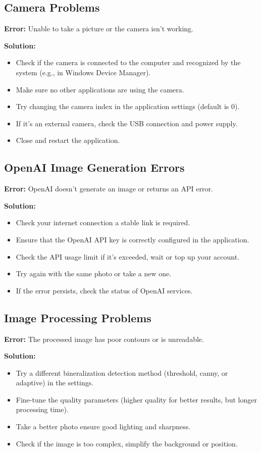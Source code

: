 \documentclass[a4paper,12pt]{article}
\begin{document}
\subsection{Camera Problems}
\textbf{Error:} Unable to take a picture or the camera isn't working.

\textbf{Solution:}
\begin{itemize}
\item Check if the camera is connected to the computer and recognized by the system (e.g., in Windows Device Manager).
\item Make sure no other applications are using the camera.
\item Try changing the camera index in the application settings (default is 0).
\item If it's an external camera, check the USB connection and power supply.
\item Close and restart the application.
\end{itemize}

\subsection{OpenAI Image Generation Errors}
\textbf{Error:} OpenAI doesn't generate an image or returns an API error.

\textbf{Solution:}
\begin{itemize}
\item Check your internet connection a stable link is required.
\item Ensure that the OpenAI API key is correctly configured in the application.
\item Check the API usage limit if it's exceeded, wait or top up your account.
\item Try again with the same photo or take a new one.
\item If the error persists, check the status of OpenAI services.
\end{itemize}

\subsection{Image Processing Problems}
\textbf{Error:} The processed image has poor contours or is unreadable.

\textbf{Solution:}
\begin{itemize}
\item Try a different bineralization detection method (threshold, canny, or adaptive) in the settings.
\item Fine-tune the quality parameters (higher quality for better results, but longer processing time).
\item Take a better photo ensure good lighting and sharpness.
\item Check if the image is too complex, simplify the background or position.
\end{itemize}
\end{document}
